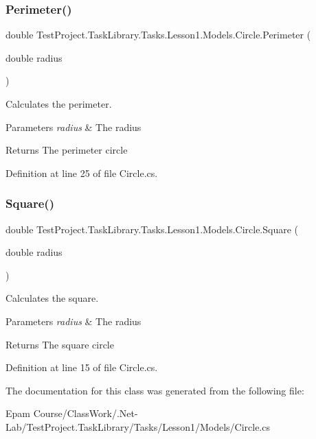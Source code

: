 \subsubsection{\texorpdfstring{Perimeter()}{Perimeter()}}
{\footnotesize\ttfamily double Test\+Project.\+Task\+Library.\+Tasks.\+Lesson1.\+Models.\+Circle.\+Perimeter (\begin{DoxyParamCaption}\item[{double}]{radius }\end{DoxyParamCaption})}



Calculates the perimeter. 


\begin{DoxyParams}{Parameters}
{\em radius} & The radius\\
\hline
\end{DoxyParams}
\begin{DoxyReturn}{Returns}
The perimeter circle
\end{DoxyReturn}


Definition at line 25 of file Circle.\+cs.

\mbox{\label{class_test_project_1_1_task_library_1_1_tasks_1_1_lesson1_1_1_models_1_1_circle_acf8a9495bb92085494ac28fb5ded7b84}} 
\subsubsection{\texorpdfstring{Square()}{Square()}}
{\footnotesize\ttfamily double Test\+Project.\+Task\+Library.\+Tasks.\+Lesson1.\+Models.\+Circle.\+Square (\begin{DoxyParamCaption}\item[{double}]{radius }\end{DoxyParamCaption})}



Calculates the square. 


\begin{DoxyParams}{Parameters}
{\em radius} & The radius\\
\hline
\end{DoxyParams}
\begin{DoxyReturn}{Returns}
The square circle
\end{DoxyReturn}


Definition at line 15 of file Circle.\+cs.



The documentation for this class was generated from the following file\+:\begin{DoxyCompactItemize}
\item 
Epam Course/\+Class\+Work/.\+Net-\/\+Lab/\+Test\+Project.\+Task\+Library/\+Tasks/\+Lesson1/\+Models/Circle.\+cs\end{DoxyCompactItemize}
